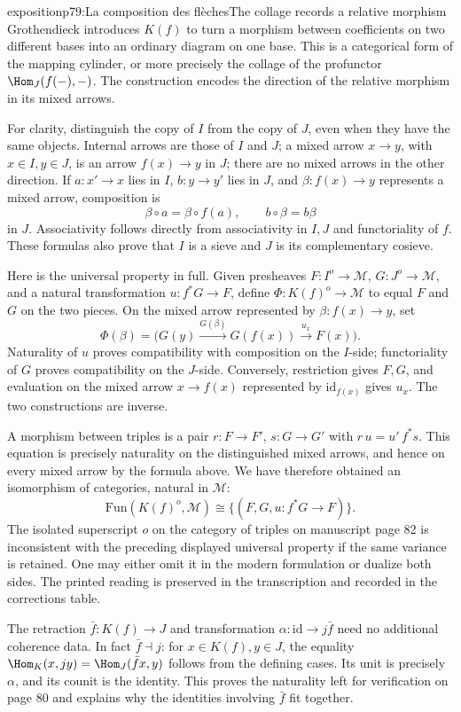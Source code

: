 \begin{dcomment}{exposition}{p79:La composition des flèches}{The collage records a relative morphism}
Grothendieck introduces \(K(f)\) to turn a morphism between coefficients on two different bases into an ordinary diagram on one base. This is a categorical form of the mapping cylinder, or more precisely the collage of the profunctor \(\Hom_J(f(-),-)\). The construction encodes the direction of the relative morphism in its mixed arrows.

For clarity, distinguish the copy of \(I\) from the copy of \(J\), even when they have the same objects. Internal arrows are those of \(I\) and \(J\); a mixed arrow \(x\to y\), with \(x\in I,y\in J\), is an arrow \(f(x)\to y\) in \(J\); there are no mixed arrows in the other direction. If \(a:x'\to x\) lies in \(I\), \(b:y\to y'\) lies in \(J\), and \(\beta:f(x)\to y\) represents a mixed arrow, composition is
\[
 \beta\circ a=\beta\circ f(a),\qquad
 b\circ\beta=b\beta
\]
in \(J\). Associativity follows directly from associativity in \(I,J\) and functoriality of \(f\). These formulas also prove that \(I\) is a sieve and \(J\) is its complementary cosieve.

Here is the universal property in full. Given presheaves \(F:I^o\to\mathcal M\), \(G:J^o\to\mathcal M\), and a natural transformation \(u:f^*G\to F\), define \(\Phi:K(f)^o\to\mathcal M\) to equal \(F\) and \(G\) on the two pieces. On the mixed arrow represented by \(\beta:f(x)\to y\), set
\[
 \Phi(\beta)=
 \bigl(G(y)\xrightarrow{G(\beta)}G(f(x))
       \xrightarrow{u_x}F(x)\bigr).
\]
Naturality of \(u\) proves compatibility with composition on the \(I\)-side; functoriality of \(G\) proves compatibility on the \(J\)-side. Conversely, restriction gives \(F,G\), and evaluation on the mixed arrow \(x\to f(x)\) represented by \(\mathrm{id}_{f(x)}\) gives \(u_x\). The two constructions are inverse.

A morphism between triples is a pair \(r:F\to F'\), \(s:G\to G'\) with \(r\,u=u'\,f^*s\). This equation is precisely naturality on the distinguished mixed arrows, and hence on every mixed arrow by the formula above. We have therefore obtained an isomorphism of categories, natural in \(\mathcal M\):
\[
 \mathrm{Fun}(K(f)^o,\mathcal M)
 \cong\{(F,G,u:f^*G\to F)\}.
\]
The isolated superscript \(o\) on the category of triples on manuscript page 82 is inconsistent with the preceding displayed universal property if the same variance is retained. One may either omit it in the modern formulation or dualize both sides. The printed reading is preserved in the transcription and recorded in the corrections table.

The retraction \(\bar f:K(f)\to J\) and transformation \(\alpha:\mathrm{id}\to j\bar f\) need no additional coherence data. In fact \(\bar f\dashv j\): for \(x\in K(f),y\in J\), the equality
\(\Hom_K(x,jy)=\Hom_J(\bar f x,y)\) follows from the defining cases. Its unit is precisely \(\alpha\), and its counit is the identity. This proves the naturality left for verification on page 80 and explains why the identities involving \(\bar f\) fit together.
\end{dcomment}

